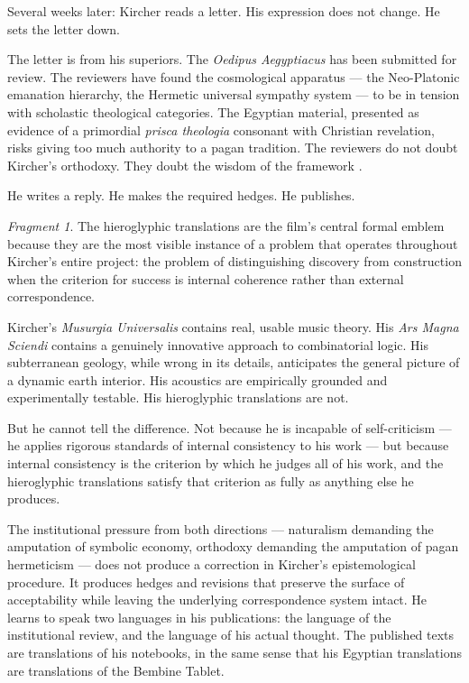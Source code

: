 \documentclass[12pt, a4paper, twoside]{memoir}
\theoremstyle{definition}
\theoremstyle{remark}
\newtheorem{fragment}{Fragment}[chapter]
\newenvironment{action}{%
  \vspace{4pt}%
  \noindent\begin{minipage}{\linewidth}%
  \setlength{\parindent}{0pt}%
  \itshape\color{kircherink}%
}{%
  \end{minipage}\vspace{6pt}%
}
\begin{document}
\begin{action}
Several weeks later: Kircher reads a letter. His expression does not change. He sets the letter down.

The letter is from his superiors. The \textit{Oedipus Aegyptiacus} has been submitted for review. The reviewers have found the cosmological apparatus --- the Neo-Platonic emanation hierarchy, the Hermetic universal sympathy system --- to be in tension with scholastic theological categories. The Egyptian material, presented as evidence of a primordial \textit{prisca theologia} consonant with Christian revelation, risks giving too much authority to a pagan tradition. The reviewers do not doubt Kircher's orthodoxy. They doubt the wisdom of the framework \cite{stolzenberg2004}.

He writes a reply. He makes the required hedges. He publishes.
\end{action}

\begin{fragment}
The hieroglyphic translations are the film's central formal emblem because they are the most visible instance of a problem that operates throughout Kircher's entire project: the problem of distinguishing discovery from construction when the criterion for success is internal coherence rather than external correspondence.

Kircher's \textit{Musurgia Universalis} \cite{kircher1650} contains real, usable music theory. His \textit{Ars Magna Sciendi} \cite{kircher1669} contains a genuinely innovative approach to combinatorial logic. His subterranean geology, while wrong in its details, anticipates the general picture of a dynamic earth interior. His acoustics are empirically grounded and experimentally testable. His hieroglyphic translations are not.

But he cannot tell the difference. Not because he is incapable of self-criticism --- he applies rigorous standards of internal consistency to his work --- but because internal consistency is the criterion by which he judges all of his work, and the hieroglyphic translations satisfy that criterion as fully as anything else he produces.

The institutional pressure from both directions --- naturalism demanding the amputation of symbolic economy, orthodoxy demanding the amputation of pagan hermeticism --- does not produce a correction in Kircher's epistemological procedure. It produces hedges and revisions that preserve the surface of acceptability while leaving the underlying correspondence system intact. He learns to speak two languages in his publications: the language of the institutional review, and the language of his actual thought. The published texts are translations of his notebooks, in the same sense that his Egyptian translations are translations of the Bembine Tablet.
\end{fragment}
\end{document}
